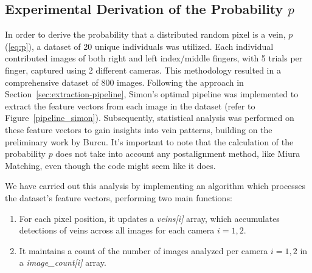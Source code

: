\subsection{Experimental Derivation of the Probability \(p\)}

In order to derive the probability that a distributed random pixel is a vein, \(p\) (\ref{eq:p}), a dataset of 20 unique individuals was utilized. Each individual contributed images of both right and left index/middle fingers, with 5 trials per finger, captured using 2 different cameras. This methodology resulted in a comprehensive dataset of 800 images. Following the approach in Section~\ref{sec:extraction-pipeline}, Simon's optimal pipeline was implemented to extract the feature vectors from each image in the dataset (refer to Figure~\ref{pipeline_simon}). Subsequently, statistical analysis was performed on these feature vectors to gain insights into vein patterns, building on the preliminary work by Burcu. It's important to note that the calculation of the probability \(p\) does not take into account any postalignment method, like Miura Matching, even though the code might seem like it does.

We have carried out this analysis by implementing an algorithm which processes the dataset's feature vectors, performing two main functions:
\begin{enumerate}
    \item For each pixel position, it updates a \textit{veins[i]} array, which accumulates detections of veins across all images for each camera \(i={1,2}\).
    \item It maintains a count of the number of images analyzed per camera \(i={1,2}\) in a \textit{image\_count[i]} array.
\end{enumerate}

